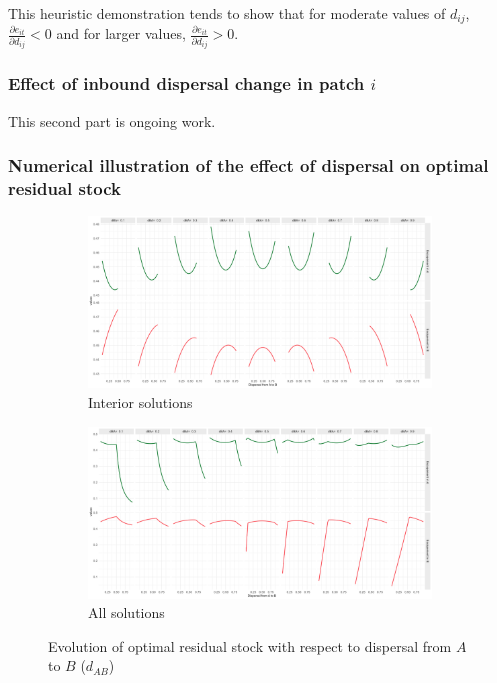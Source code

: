 This heuristic demonstration tends to show that for moderate values of $d_{ij}$,$\frac{\partial e_{it}}{\partial d_{ij}}<0$ and for larger values, $\frac{\partial e_{it}}{\partial d_{ij}}>0$. 

\subsubsection{Effect of inbound dispersal change in patch $i$}

This second part is ongoing work. 


\subsubsection{Numerical illustration of the effect of dispersal on optimal residual stock}
\begin{figure}[H]
    \centering
    \begin{subfigure}{0.8\textwidth}
        \centering
        \includegraphics[width=\textwidth]{figures/fences/derivative_escapements_dAB_interior_baseline.jpg}
        \caption{Interior solutions}
        \label{fig:escapement_derivative_interior}
    \end{subfigure}
    \hfill
    \begin{subfigure}{0.8\textwidth}
        \centering
        \includegraphics[width=\textwidth]{figures/fences/derivative_escapements_dAB_baseline.jpg}
        \caption{All solutions}
        \label{fig:escapement_derivative_overall}
    \end{subfigure}
    \caption{Evolution of optimal residual stock with respect to dispersal from $A$ to $B$ ($d_{AB}$)}
    \label{fig:overall}
\end{figure}

